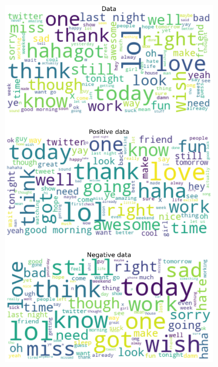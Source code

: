 \documentclass{article}
\begin{document}
\begin{itemize}
\begin{figure}[H]
\begin{subfigure}[b]{0.24\textwidth}
      \includegraphics[width=\textwidth]{chapter-06/section-01-01/13/visualization/3/wordcloud.png}
    \end{subfigure}
    \begin{subfigure}[b]{0.24\textwidth}
      \centering

\end{subfigure}
\end{figure}
\end{itemize}
\end{document}

